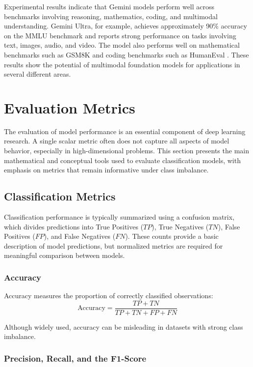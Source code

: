 Experimental results indicate that Gemini models perform well across benchmarks involving reasoning, mathematics, coding, and multimodal understanding. Gemini Ultra, for example, achieves approximately 90\% accuracy on the MMLU benchmark and reports strong performance on tasks involving text, images, audio, and video. The model also performs well on mathematical benchmarks such as GSM8K and coding benchmarks such as HumanEval \citep{team2023gemini}. These results show the potential of multimodal foundation models for applications in several different areas.

\section{Evaluation Metrics}
The evaluation of model performance is an essential component of deep learning research. A single scalar metric often does not capture all aspects of model behavior, especially in high-dimensional problems. This section presents the main mathematical and conceptual tools used to evaluate classification models, with emphasis on metrics that remain informative under class imbalance.

\subsection{Classification Metrics}

Classification performance is typically summarized using a confusion matrix, which divides predictions into True Positives ($TP$), True Negatives ($TN$), False Positives ($FP$), and False Negatives ($FN$). These counts provide a basic description of model predictions, but normalized metrics are required for meaningful comparison between models.

\subsubsection{Accuracy}

Accuracy measures the proportion of correctly classified observations:
\begin{equation}
\text{Accuracy} = \frac{TP + TN}{TP + TN + FP + FN}
\end{equation}

Although widely used, accuracy can be misleading in datasets with strong class imbalance.

\subsubsection{Precision, Recall, and the F1-Score}


